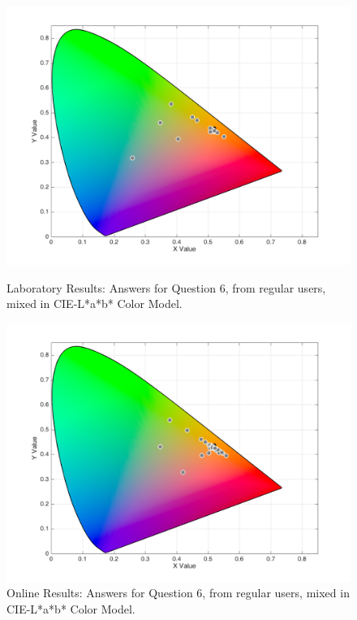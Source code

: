 \begin{figure}[!htbp]
  \centering
  \begin{minipage}{0.48\textwidth}
    \centering
    \includegraphics[width=\textwidth]{images/results/6_lab_Labresponses.png}
    \caption[Laboratory Results: Answers for Question 6, from regular users, mixed in CIE-L*a*b* Color Model.]{Laboratory Results: Answers for Question 6, from regular users, mixed in CIE-L*a*b* Color Model.}
    \label{fig:lablabregular_6}
  \end{minipage}\hfill
  \begin{minipage}{0.48\textwidth}
    \centering
    \includegraphics[width=\textwidth]{images/results/6_online_Labresponses.png}
    \caption[Online Results: Answers for Question 6, from regular users, mixed in CIE-L*a*b* Color Model.]{Online Results: Answers for Question 6, from regular users, mixed in CIE-L*a*b* Color Model.}
    \label{fig:onlinelabregular_6}
  \end{minipage}
\end{figure}
